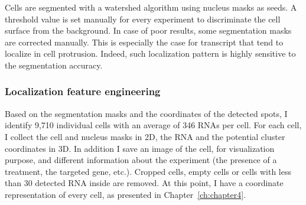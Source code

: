 Cells are segmented with a watershed algorithm using nucleus masks as seeds.
A threshold value is set manually for every experiment to discriminate the cell surface from the background.
In case of poor results, some segmentation masks are corrected manually.
This is especially the case for transcript that tend to localize in cell protrusion.
Indeed, such localization pattern is highly sensitive to the segmentation accuracy.

\subsubsection{Localization feature engineering}

Based on the segmentation masks and the coordinates of the detected spots, I identify 9,710 individual cells with an average of 346 \ac{RNA}s per cell.
For each cell, I collect the cell and nucleus masks in 2D, the \ac{RNA} and the potential cluster coordinates in 3D.
In addition I save an image of the cell, for visualization purpose, and different information about the experiment (the presence of a treatment, the targeted gene, etc.).
Cropped cells, empty cells or cells with less than 30 detected \ac{RNA} inside are removed.
At this point, I have a coordinate representation of every cell, as presented in Chapter~\ref{ch:chapter4}.

